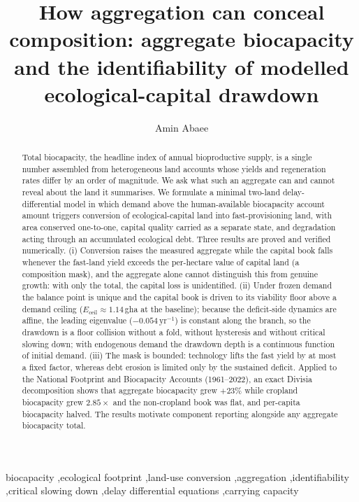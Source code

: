 \documentclass[preprint,12pt,authoryear]{elsarticle}
\newcommand{\Eceil}{E_{\mathrm{ceil}}}
\begin{document}
\begin{frontmatter}

\title{How aggregation can conceal composition: aggregate biocapacity and the identifiability of modelled ecological-capital drawdown}

\author[1]{Amin Abaee}

\begin{abstract}
\footnotesize
Total biocapacity, the headline index of annual bioproductive supply, is a single number assembled from heterogeneous land accounts whose yields and regeneration rates differ by an order of magnitude. We ask what such an aggregate can and cannot reveal about the land it summarises. We formulate a minimal two-land delay-differential model in which demand above the human-available biocapacity account amount triggers conversion of ecological-capital land into fast-provisioning land, with area conserved one-to-one, capital quality carried as a separate state, and degradation acting through an accumulated ecological debt. Three results are proved and verified numerically. (i) Conversion raises the measured aggregate while the capital book falls whenever the fast-land yield exceeds the per-hectare value of capital land (a composition mask), and the aggregate alone cannot distinguish this from genuine growth: with only the total, the capital loss is unidentified. (ii) Under frozen demand the balance point is unique and the capital book is driven to its viability floor above a demand ceiling ($\Eceil\approx1.14$\,gha at the baseline); because the deficit-side dynamics are affine, the leading eigenvalue ($-0.054\,\mathrm{yr}^{-1}$) is constant along the branch, so the drawdown is a floor collision without a fold, without hysteresis and without critical slowing down; with endogenous demand the drawdown depth is a continuous function of initial demand. (iii) The mask is bounded: technology lifts the fast yield by at most a fixed factor, whereas debt erosion is limited only by the sustained deficit. Applied to the National Footprint and Biocapacity Accounts (1961--2022), an exact Divisia decomposition shows that aggregate biocapacity grew $+23\%$ while cropland biocapacity grew $2.85\times$ and the non-cropland book was flat, and per-capita biocapacity halved. The results motivate component reporting alongside any aggregate biocapacity total.
\end{abstract}

\begin{keyword}
\footnotesize
biocapacity \sep ecological footprint \sep land-use conversion \sep aggregation \sep identifiability \sep critical slowing down \sep delay differential equations \sep carrying capacity
\end{keyword}

\end{frontmatter}
\end{document}
